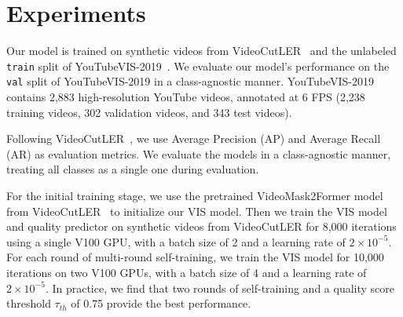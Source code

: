 \section{Experiments}



Our model is trained on synthetic videos from VideoCutLER~\cite{videocutler} and the unlabeled \texttt{train} split of YouTubeVIS-2019~\cite{ytvis2019}. We evaluate our model's performance on the \texttt{val} split of YouTubeVIS-2019 in a class-agnostic manner. YouTubeVIS-2019 contains 2,883 high-resolution YouTube videos, annotated at 6 FPS (2,238 training videos, 302 validation videos, and 343 test videos).



Following VideoCutLER~\cite{videocutler}, we use Average Precision (AP) and Average Recall (AR) as evaluation metrics. We evaluate the models in a class-agnostic manner, treating all classes as a single one during evaluation.

For the initial training stage, we use the pretrained VideoMask2Former model~\cite{mask2former, videomask2former} from VideoCutLER~\cite{videocutler} to initialize our VIS model. Then we train the VIS model and quality predictor on synthetic videos from VideoCutLER for 8,000 iterations using a single V100 GPU, with a batch size of 2 and a learning rate of $2 \times 10^{-5}$. For each round of multi-round self-training, we train the VIS model for 10,000 iterations on two V100 GPUs, with a batch size of 4 and a learning rate of $2 \times 10^{-5}$. In practice, we find that two rounds of self-training and a quality score threshold $\tau_{th}$ of 0.75 provide the best performance. 

